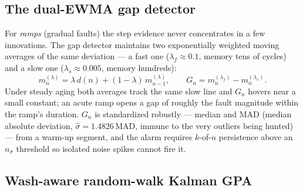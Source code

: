 \subsection{The dual-EWMA gap detector}
\label{sec:math-gap}

For \emph{ramps} (gradual faults) the step evidence never concentrates in a few
innovations. The gap detector maintains two exponentially weighted moving averages of the
same deviation --- a fast one ($\lambda_f \approx 0.1$, memory tens of cycles) and a slow
one ($\lambda_s \approx 0.005$, memory hundreds):
\begin{equation}
  m_n^{(\lambda)} = \lambda\, d(n) + (1-\lambda)\, m_{n-1}^{(\lambda)}, \qquad
  G_n = m_n^{(\lambda_f)} - m_n^{(\lambda_s)}.
  \label{eq:gap}
\end{equation}
Under steady aging both averages track the same slow line and $G_n$ hovers near a small
constant; an acute ramp opens a gap of roughly the fault magnitude within the ramp's
duration. $G_n$ is standardized robustly --- median and MAD (median absolute deviation,
$\hat\sigma = 1.4826\,\mathrm{MAD}$, immune to the very outliers being hunted) --- from a
warm-up segment, and the alarm requires $k$-of-$n$ persistence above an $n_\sigma$
threshold so isolated noise spikes cannot fire it.

\subsection{Wash-aware random-walk Kalman GPA}
\label{sec:math-kalman}

